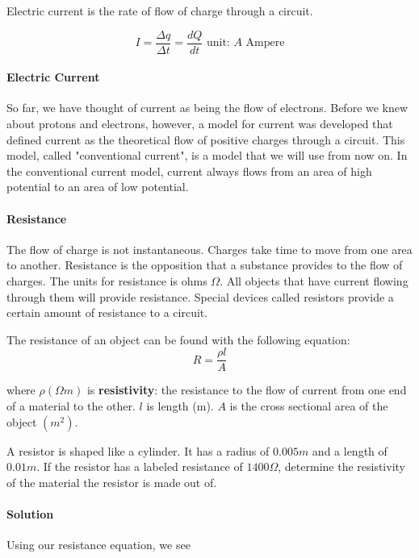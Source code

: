 \documentclass{scrartcl}
\theoremstyle{definition}
\begin{document}
	\begin{theorem}
		Electric current is the rate of flow of charge through a circuit.
		
		$$
		I = \frac{\Delta q}{\Delta t} = \frac{dQ}{dt} \text {   unit: $A$ Ampere}
		$$
	\end{theorem}
	
	\paragraph{Electric Current} So far, we have thought of current as being the flow of electrons. Before we knew about protons and electrons, however, a model for current was developed that defined current as the theoretical flow of positive charges through a circuit. This model, called "conventional current", is a model that we will use from now on. In the conventional current model, current always flows from an area of high potential to an area of low potential.
	
	\paragraph{Resistance} The flow of charge is not instantaneous. Charges take time to move from one area to another. Resistance is the opposition that a substance provides to the flow of charges. The units for resistance is ohms $\Omega$. All objects that have current flowing through them will provide resistance. Special devices called resistors provide a certain amount of resistance to a circuit. 
	
	\begin{theorem}[Resistance]
		The resistance of an object can be found with the following equation:
		$$
		R = \frac{\rho l}{A}
		$$
		
		\noindent where $\rho (\Omega m)$ is \textbf{resistivity}: the resistance to the flow of current from one end of a material to the other. $l$ is length (m). $A$ is the cross sectional area of the object $(m^2)$. 
	\end{theorem}
	
	\begin{example}
		A resistor is shaped like a cylinder. It has a radius of $0.005m$ and a length of $0.01m$. If the resistor has a labeled resistance of $1400 \Omega$, determine the resistivity of the material the resistor is made out of. 
	\end{example}
	
	\paragraph{Solution} Using our resistance equation, we see
	
\end{document}
